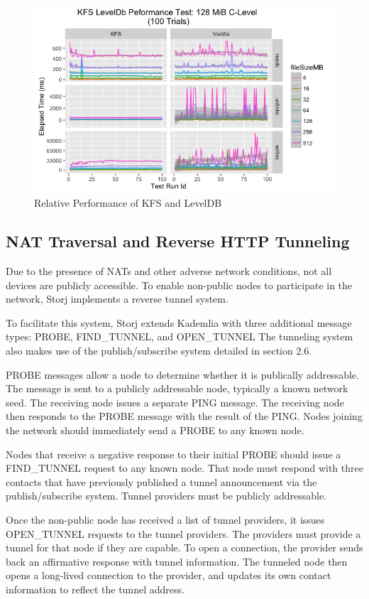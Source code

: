 \documentclass[a4paper,10pt]{article}
\begin{document}
\begin{figure}[hbt]
\centering
\includegraphics[width=\linewidth]{6}
\caption{Relative Performance of KFS and LevelDB}
\end{figure}

\subsection{NAT Traversal and Reverse HTTP Tunneling}
Due to the presence of NATs and other adverse network conditions, not all devices are publicly accessible. To enable non-public nodes to participate in the network, Storj implements a reverse tunnel system.

To facilitate this system, Storj extends Kademlia with three additional message types: PROBE, FIND\_TUNNEL, and OPEN\_TUNNEL The tunneling system also makes use of the publish/subscribe system detailed in section 2.6.

PROBE messages allow a node to determine whether it is publically addressable. The message is sent to a publicly addressable node, typically a known network seed. The receiving node issues a separate PING message. The receiving node then responds to the PROBE message with the result of the PING. Nodes joining the network should immediately send a PROBE to any known node.

Nodes that receive a negative response to their initial PROBE should issue a FIND\_TUNNEL request to any known node. That node must respond with three contacts that have previously published a tunnel announcement via the publish/subscribe system. Tunnel providers must be publicly addressable.

Once the non-public node has received a list of tunnel providers, it issues OPEN\_TUNNEL requests to the tunnel providers. The providers must provide a tunnel for that node if they are capable. To open a connection, the provider sends back an affirmative response with tunnel information. The tunneled node then opens a long-lived connection to the provider, and updates its own contact information to reflect the tunnel address.
\end{document}
